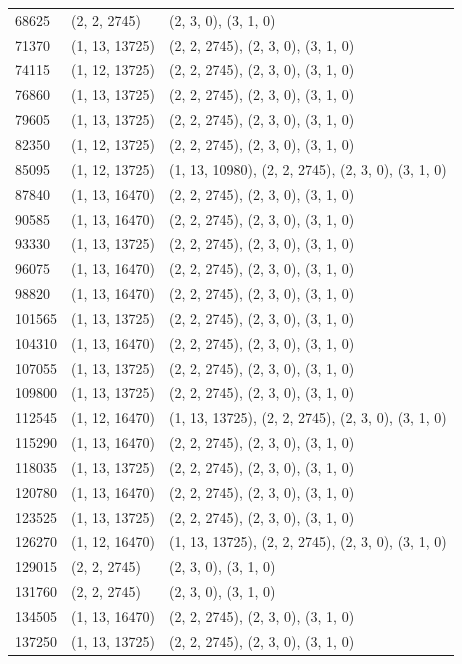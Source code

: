 \begin{center}
\begin{longtable}{|l|l|l|}
68625 & (2, 2, 2745) & (2, 3, 0), (3, 1, 0) \\
71370 & (1, 13, 13725) & (2, 2, 2745), (2, 3, 0), (3, 1, 0) \\
74115 & (1, 12, 13725) & (2, 2, 2745), (2, 3, 0), (3, 1, 0) \\
76860 & (1, 13, 13725) & (2, 2, 2745), (2, 3, 0), (3, 1, 0) \\
79605 & (1, 13, 13725) & (2, 2, 2745), (2, 3, 0), (3, 1, 0) \\
82350 & (1, 12, 13725) & (2, 2, 2745), (2, 3, 0), (3, 1, 0) \\
85095 & (1, 12, 13725) & (1, 13, 10980), (2, 2, 2745), (2, 3, 0), (3, 1, 0) \\
87840 & (1, 13, 16470) & (2, 2, 2745), (2, 3, 0), (3, 1, 0) \\
90585 & (1, 13, 16470) & (2, 2, 2745), (2, 3, 0), (3, 1, 0) \\
93330 & (1, 13, 13725) & (2, 2, 2745), (2, 3, 0), (3, 1, 0) \\
96075 & (1, 13, 16470) & (2, 2, 2745), (2, 3, 0), (3, 1, 0) \\
98820 & (1, 13, 16470) & (2, 2, 2745), (2, 3, 0), (3, 1, 0) \\
101565 & (1, 13, 13725) & (2, 2, 2745), (2, 3, 0), (3, 1, 0) \\
104310 & (1, 13, 16470) & (2, 2, 2745), (2, 3, 0), (3, 1, 0) \\
107055 & (1, 13, 13725) & (2, 2, 2745), (2, 3, 0), (3, 1, 0) \\
109800 & (1, 13, 13725) & (2, 2, 2745), (2, 3, 0), (3, 1, 0) \\
112545 & (1, 12, 16470) & (1, 13, 13725), (2, 2, 2745), (2, 3, 0), (3, 1, 0) \\
115290 & (1, 13, 16470) & (2, 2, 2745), (2, 3, 0), (3, 1, 0) \\
118035 & (1, 13, 13725) & (2, 2, 2745), (2, 3, 0), (3, 1, 0) \\
120780 & (1, 13, 16470) & (2, 2, 2745), (2, 3, 0), (3, 1, 0) \\
123525 & (1, 13, 13725) & (2, 2, 2745), (2, 3, 0), (3, 1, 0) \\
126270 & (1, 12, 16470) & (1, 13, 13725), (2, 2, 2745), (2, 3, 0), (3, 1, 0) \\
129015 & (2, 2, 2745) & (2, 3, 0), (3, 1, 0) \\
131760 & (2, 2, 2745) & (2, 3, 0), (3, 1, 0) \\
134505 & (1, 13, 16470) & (2, 2, 2745), (2, 3, 0), (3, 1, 0) \\
137250 & (1, 13, 13725) & (2, 2, 2745), (2, 3, 0), (3, 1, 0) \\

\end{longtable}
\end{center}

